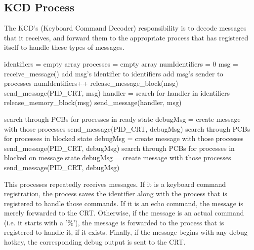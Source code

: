 \documentclass[12pt]{report}
\begin{document}
\subsection{KCD Process}

The KCD's (Keyboard Command Decoder) responsibility is to decode messages that it receives, and forward them to the appropriate process that has registered itself to handle these types of messages.

\begin{algorithmic}[1]
    \State identifiers = empty array
    \State processes = empty array
    \State numIdentifiers = 0
      \State msg = receive\_message()
        \State add msg's identifier to identifiers
        \State add msg's sender to processes
        \State numIdentifiers++
        \State release\_message\_block(msg)
        \State send\_message(PID\_CRT, msg)
      \Else
          \State handler = search for handler in identifiers
        \EndIf
          \State release\_memory\_block(msg)
        \Else
          \State send\_message(handler, msg)
        \EndIf

          \State search through PCBs for processes in ready state
          \State debugMsg = create message with those processes
          \State send\_message(PID\_CRT, debugMsg)
          \State search through PCBs for processes in blocked state
          \State debugMsg = create message with those processes
          \State send\_message(PID\_CRT, debugMsg)
          \State search through PCBs for processes in blocked on message state
          \State debugMsg = create message with those processes
          \State send\_message(PID\_CRT, debugMsg)
        \EndIf
      \EndIf
    \EndWhile
  \EndFunction
\end{algorithmic}

This processes repeatedly receives messages. If it is a keyboard command registration, the process saves the identifier along with the process that is registered to handle those commands. If it is an echo command, the message is merely forwarded to the CRT. Otherwise, if the message is an actual command (i.e. it starts with a '\%'), the message is forwarded to the process that is registered to handle it, if it exists. Finally, if the message begins with any debug hotkey, the corresponding debug output is sent to the CRT.
\end{document}
